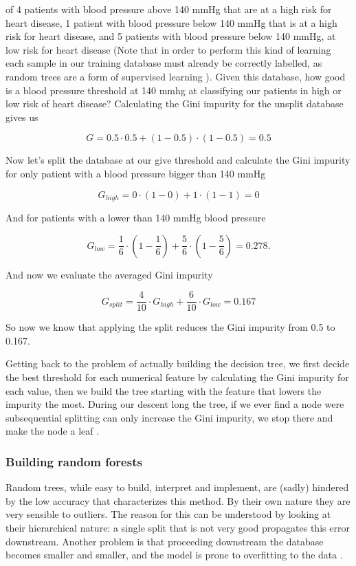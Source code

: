 \documentclass[a4paper]{report}
\begin{document}
of 4 patients with blood pressure above 140 mmHg that are at a high risk for heart disease, 1 patient with blood pressure below 140 mmHg that is at a high risk for heart disease, and 5 patients with blood pressure below 140 mmHg, at low risk for heart disease (Note that in order to perform this kind of learning each sample in our training database must already be correctly labelled, as random trees are a form of supervised learning ).
Given this database, how good is a blood pressure threshold at 140 mmhg at classifying our patients in high or low risk of heart disease?
Calculating the Gini impurity for the unsplit database gives us

\begin{equation}
	G = 0.5 \cdot 0.5 + (1-0.5) \cdot (1-0.5) = 0.5
\end{equation}

Now let's split the database at our give threshold and calculate the Gini impurity for only patient with a blood pressure bigger than 140 mmHg

\begin{equation}
	G_{high} = 0 \cdot (1 -0) + 1 \cdot (1-1) = 0
\end{equation}

And for patients with a lower than 140 mmHg blood pressure

\begin{equation}
	G_{low} = \frac{1}{6} \cdot (1 - \frac{1}{6}) + \frac{5}{6} \cdot (1- \frac{5}{6}) = 0.278.
\end{equation}

And now we evaluate the averaged Gini impurity

\begin{equation}
	G_{split} = \frac{4}{10} \cdot G_{high} + \frac{6}{10} \cdot G_{low} = 0.167
\end{equation}

So now we know that applying the split reduces the Gini impurity from 0.5 to 0.167.

Getting back to the problem of actually building the decision tree, we first decide the best threshold for each numerical feature by calculating the Gini impurity for each value, then we build the tree starting with the feature that lowers the impurity the most.
During our descent long the tree, if we ever find a node were subsequential splitting can only increase the Gini impurity, we stop there and make the node a leaf \cite{breiman2001random}.

\subsubsection{Building random forests}
Random trees, while easy to build, interpret and implement, are (sadly) hindered by the low accuracy that characterizes this method.
By their own nature they are very sensible to outliers. The reason for this can be understood by looking at their hierarchical nature: a single split that is not very good propagates this error downstream.
Another problem is that proceeding downstream the database becomes smaller and smaller, and the model is prone to overfitting to the data \cite{bramer2007avoiding}.
\end{document}
